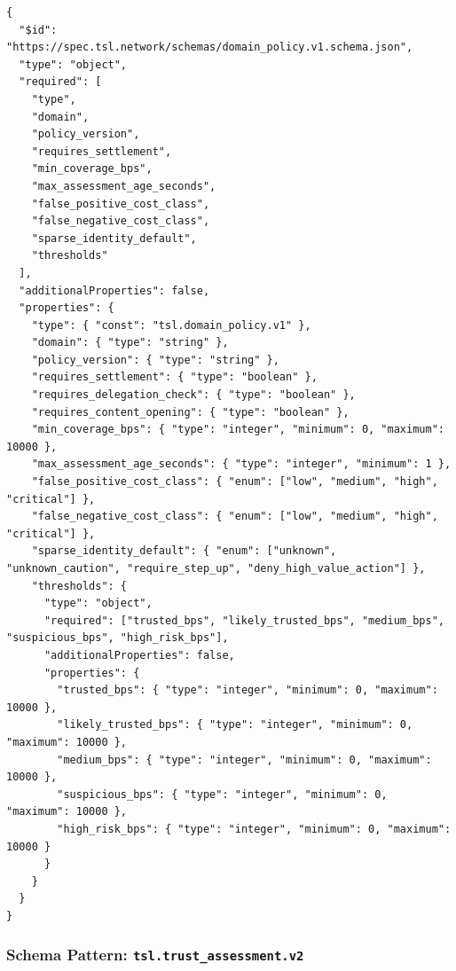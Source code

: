 \documentclass[11pt]{article}
\begin{document}
\begin{lstlisting}[style=tslcode]
{
  "$id": "https://spec.tsl.network/schemas/domain_policy.v1.schema.json",
  "type": "object",
  "required": [
    "type",
    "domain",
    "policy_version",
    "requires_settlement",
    "min_coverage_bps",
    "max_assessment_age_seconds",
    "false_positive_cost_class",
    "false_negative_cost_class",
    "sparse_identity_default",
    "thresholds"
  ],
  "additionalProperties": false,
  "properties": {
    "type": { "const": "tsl.domain_policy.v1" },
    "domain": { "type": "string" },
    "policy_version": { "type": "string" },
    "requires_settlement": { "type": "boolean" },
    "requires_delegation_check": { "type": "boolean" },
    "requires_content_opening": { "type": "boolean" },
    "min_coverage_bps": { "type": "integer", "minimum": 0, "maximum": 10000 },
    "max_assessment_age_seconds": { "type": "integer", "minimum": 1 },
    "false_positive_cost_class": { "enum": ["low", "medium", "high", "critical"] },
    "false_negative_cost_class": { "enum": ["low", "medium", "high", "critical"] },
    "sparse_identity_default": { "enum": ["unknown", "unknown_caution", "require_step_up", "deny_high_value_action"] },
    "thresholds": {
      "type": "object",
      "required": ["trusted_bps", "likely_trusted_bps", "medium_bps", "suspicious_bps", "high_risk_bps"],
      "additionalProperties": false,
      "properties": {
        "trusted_bps": { "type": "integer", "minimum": 0, "maximum": 10000 },
        "likely_trusted_bps": { "type": "integer", "minimum": 0, "maximum": 10000 },
        "medium_bps": { "type": "integer", "minimum": 0, "maximum": 10000 },
        "suspicious_bps": { "type": "integer", "minimum": 0, "maximum": 10000 },
        "high_risk_bps": { "type": "integer", "minimum": 0, "maximum": 10000 }
      }
    }
  }
}
\end{lstlisting}

\subsubsection{Schema Pattern: \texttt{tsl.trust\_assessment.v2}}
\end{document}
